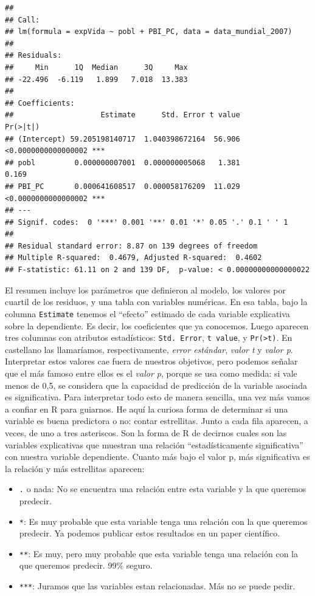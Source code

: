 \documentclass[spanish,]{book}
\providecommand{\tightlist}{%
  \setlength{\itemsep}{0pt}\setlength{\parskip}{0pt}}
\begin{document}
\begin{verbatim}
## 
## Call:
## lm(formula = expVida ~ pobl + PBI_PC, data = data_mundial_2007)
## 
## Residuals:
##     Min      1Q  Median      3Q     Max 
## -22.496  -6.119   1.899   7.018  13.383 
## 
## Coefficients:
##                    Estimate      Std. Error t value            Pr(>|t|)    
## (Intercept) 59.205198140717  1.040398672164  56.906 <0.0000000000000002 ***
## pobl         0.000000007001  0.000000005068   1.381               0.169    
## PBI_PC       0.000641608517  0.000058176209  11.029 <0.0000000000000002 ***
## ---
## Signif. codes:  0 '***' 0.001 '**' 0.01 '*' 0.05 '.' 0.1 ' ' 1
## 
## Residual standard error: 8.87 on 139 degrees of freedom
## Multiple R-squared:  0.4679, Adjusted R-squared:  0.4602 
## F-statistic: 61.11 on 2 and 139 DF,  p-value: < 0.00000000000000022
\end{verbatim}

El resumen incluye los parámetros que definieron al modelo, los valores por cuartil de los residuos, y una tabla con variables numéricas. En esa tabla, bajo la columna \texttt{Estimate} tenemos el ``efecto'' estimado de cada variable explicativa sobre la dependiente. Es decir, los coeficientes que ya conocemos. Luego aparecen tres columnas con atributos estadísticos: \texttt{Std.\ Error}, \texttt{t\ value}, y \texttt{Pr(\textgreater{}\textbar{}t\textbar{})}. En castellano las llamaríamos, respectivamente, \emph{error estándar}, \emph{valor t} y \emph{valor p}. Interpretar estos valores cae fuera de nuestros objetivos, pero podemos señalar que el más famoso entre ellos es el \emph{valor p}, porque se usa como medida: si vale menos de 0,5, se considera que la capacidad de predicción de la variable asociada es significativa. Para interpretar todo esto de manera sencilla, una vez más vamos a confiar en R para guiarnos. He aquí la curiosa forma de determinar si una variable es buena predictora o no: contar estrellitas. Junto a cada fila aparecen, a veces, de uno a tres asteriscos. Son la forma de R de decirnos cuales son las variables explicativas que muestran una relación ``estadísticamente significativa'' con nuestra variable dependiente. Cuanto más bajo el valor p, más significativa es la relación y más estrellitas aparecen:

\begin{itemize}
\tightlist
\item
  \texttt{.} o nada: No se encuentra una relación entre esta variable y la que queremos predecir.
\item
  \texttt{*}: Es muy probable que esta variable tenga una relación con la que queremos predecir. Ya podemos publicar estos resultados en un paper científico.
\item
  \texttt{**}: Es muy, pero muy probable que esta variable tenga una relación con la que queremos predecir. 99\% seguro.
\item
  \texttt{***}: Juramos que las variables estan relacionadas. Más no se puede pedir.
\end{itemize}
\end{document}
